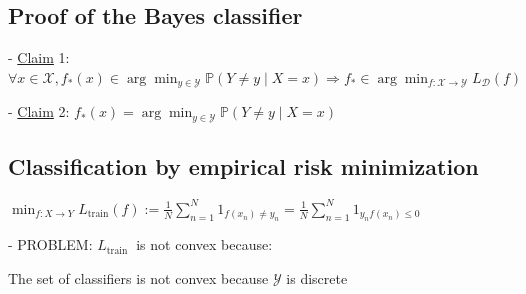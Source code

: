 
\subsection*{Proof of the Bayes classifier}
- \underline{Claim} 1: $\forall x \in \mathscr{X}, f_{*}(x) \in \arg \min _{y \in \mathscr{Y}} \mathbb{P}(Y \neq y \mid X=x) \Longrightarrow f_{*} \in \arg \min _{f: \mathscr{X} \rightarrow \mathscr{Y}} L_{\mathscr{D}}(f)$

- \underline{Claim} 2: $f_{*}(x)=\arg \min _{y \in \mathscr{Y}} \mathbb{P}(Y \neq y \mid X=x)$




\subsection*{Classification by empirical risk minimization}
$
\min _{f: X \rightarrow Y} L_{\operatorname{train}}(f):=\frac{1}{N} \sum_{n=1}^{N} 1_{f\left(x_{n}\right) \neq y_{n}}=\frac{1}{N} \sum_{n=1}^{N} 1_{y_{n} f\left(x_{n}\right) \leq 0}
$

- PROBLEM: $L_{\text {train }}$ is not convex because:

The set of classifiers is not convex because $\mathcal{Y}$ 
is discrete

